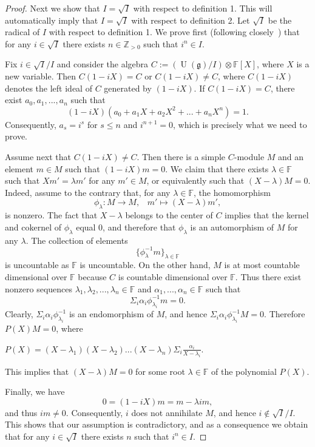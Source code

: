 \documentclass{emsprocart}
\begin{document}
\begin{proof}
Next we show that $I=\sqrt I$ with respect to definition 1. This will automatically imply that $I=\sqrt I$ with respect to definition 2. Let $\sqrt I$ be the radical of $I$ with respect to definition 1. We prove first (following closely~\cite[3.1.15]{Dix}) that for any $i\in \sqrt I$ there exists $n\in\mathbb Z_{>0}$ such that $i^n\in I$.

Fix $i\in\sqrt I/I$ and consider the algebra $C:=(\operatorname{U}(\mathfrak g)/I)\otimes \mathbb F[X]$, where $X$ is a new variable. Then $C(1-iX)=C$ or $C(1-iX)\ne C$, where $C(1-iX)$ denotes the left ideal of $C$ generated by $(1-iX)$. If $C(1-iX)=C$, there exist $a_0, a_1,..., a_n$ such that $$(1-iX)(a_0+a_1X+a_2X^2+...+a_nX^n)=1.$$ Consequently, $a_s=i^s$ for $s\le n$ and $i^{n+1}=0$, which is precisely what we need to prove.

Assume next that $C(1-iX)\ne C$. Then there is a simple $C$-module $M$ and an element $m\in M$ such that $(1-iX)m=0$. We claim that there exists $\lambda\in \mathbb F$ such that $Xm'=\lambda m'$ for any $m'\in M$, or equivalently  such that $(X-\lambda)M=0$. Indeed, assume to the contrary that, for any $\lambda\in\mathbb F$, the homomorphism $$\phi_\lambda: M\to M,\hspace{10pt}m'\mapsto (X-\lambda)m',$$ is nonzero. The fact that $X-\lambda$ belongs to the center of $C$ implies that the kernel and cokernel
of $\phi_\lambda$ equal 0, and therefore that $\phi_\lambda$ is an automorphism of $M$ for any $\lambda$. The collection of elements
$$\{\phi^{-1}_\lambda m\}_{\lambda\in\mathbb F}$$ is uncountable as $\mathbb F$ is uncountable. On the other hand, $M$ is at most countable dimensional over $\mathbb F$ because $C$ is countable dimensional over $\mathbb F$. Thus there exist nonzero sequences $\lambda_1, \lambda_2, ..., \lambda_n\in\mathbb F$ and $\alpha_1, ..., \alpha_n\in\mathbb F$ such that
$$\Sigma_i\alpha_i\phi_{\lambda_i}^{-1}m=0.$$
Clearly, $\Sigma_i\alpha_i\phi_{\lambda_i}^{-1}$ is an endomorphism of $M$, and hence $\Sigma_i\alpha_i\phi_{\lambda_i}^{-1}M=0$. Therefore $P(X)M=0$, where \begin{center}$P(X)=(X-\lambda_1)(X-\lambda_2)...(X-\lambda_n){\Sigma}_i\frac{\alpha_i}{X-\lambda_i}.$\end{center} This implies that $(X-\lambda)M=0$ for some root $\lambda\in\mathbb F$ of the polynomial $P(X)$.

Finally, we have $$0=(1-iX)m=m-\lambda im,$$and thus $im\ne 0$. Consequently, $i$ does not annihilate $M$, and hence $i\not\in\sqrt I/I$. This shows that our assumption is contradictory, and as a consequence we obtain that for any $i\in\sqrt I$ there exists $n$ such that $i^n\in I$.



\end{proof}
\end{document}
